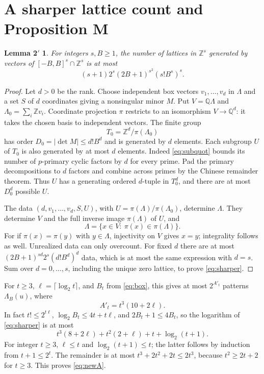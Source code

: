 \documentclass[11pt]{amsart}
\newtheorem*{lemma2prime}{Lemma 2$'$}
\theoremstyle{remark}
\newcommand{\Z}{\mathbb Z}
\newcommand{\Q}{\mathbb Q}
\newcommand{\LB}{\Lambda_B}
\begin{document}
\section{A sharper lattice count and Proposition M}\label{sec:M}
\begin{lemma2prime}
For integers $s,B\ge1$, the number of lattices in $\Z^s$ generated
by vectors of $[-B,B]^s\cap\Z^s$ is at most
\begin{equation}\label{eq:sharper}
 (s+1)2^s(2B+1)^{s^2}(s!B^s)^s.
\end{equation}
\end{lemma2prime}
\begin{proof}
Let $d>0$ be the rank. Choose independent box vectors
$v_1,\ldots,v_d$ in $\Lambda$ and a set $S$ of $d$ coordinates giving
a nonsingular minor $M$. Put $V=\Q\Lambda$ and
$\Lambda_0=\sum_i\Z v_i$. Coordinate projection $\pi$ restricts to
an isomorphism $V\to\Q^d$: it takes the chosen basis to independent
vectors. The finite group
\[
 T_0=\Z^d/\pi(\Lambda_0)
\]
has order $D_0=|\det M|\le d!B^d$ and is generated by $d$ elements.
Each subgroup $U$ of $T_0$ is also generated by at most $d$ elements.
Indeed \eqref{eq:subquot} bounds its number of $p$-primary cyclic
factors by $d$ for every prime. Pad the primary decompositions to $d$
factors and combine across primes by the Chinese remainder theorem.
Thus $U$ has a generating ordered $d$-tuple in $T_0^d$, and there
are at most $D_0^d$ possible $U$.

The data $(d,v_1,\ldots,v_d,S,U)$, with
$U=\pi(\Lambda)/\pi(\Lambda_0)$, determine $\Lambda$. They determine
$V$ and the full inverse image $\pi(\Lambda)$ of $U$, and
\[
 \Lambda=\{x\in V:\ \pi(x)\in\pi(\Lambda)\}.
\]
For if $\pi(x)=\pi(y)$ with $y\in\Lambda$, injectivity on $V$ gives
$x=y$; integrality follows as well. Unrealized data can only overcount.
For fixed $d$ there are at most
$(2B+1)^{sd}2^s(d!B^d)^d$ data, which is at most the same expression
with $d=s$. Sum over $d=0,\ldots,s$, including the unique zero
lattice, to prove \eqref{eq:sharper}.
\end{proof}

For $t\ge3$, $\ell=\lceil\log_2t\rceil$, and $B_t$ from
\eqref{eq:box}, this gives at most $2^{A'_t}$ patterns $\LB(u)$, where
\begin{equation}\label{eq:newA}
 A'_t=t^3(10+2\ell).
\end{equation}
In fact $t!\le2^{t\ell}$, $\log_2B_t\le4t+t\ell$, and
$2B_t+1\le4B_t$, so the logarithm of \eqref{eq:sharper} is at most
\[
 t^3(8+2\ell)+t^2(2+\ell)+t+\log_2(t+1).
\]
For integer $t\ge3$, $\ell\le t$ and $\log_2(t+1)\le t$; the
latter follows by induction from $t+1\le2^t$. The remainder is at
most $t^3+2t^2+2t\le2t^3$, because $t^2\ge2t+2$ for $t\ge3$.
This proves \eqref{eq:newA}.
\end{document}
